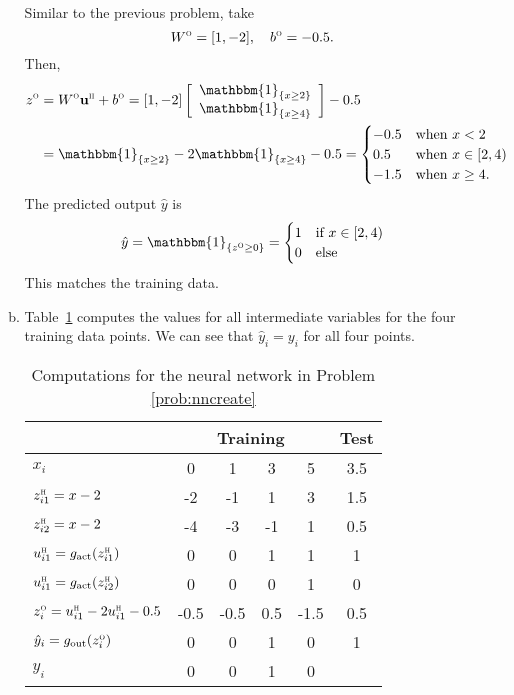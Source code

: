 \documentclass[11pt]{article}
\newcommand{\ubf}{\mathbf{u}}
\newcommand{\indic}[1]{\mathbbm{1}_{ \{ {#1} \} }}
\def\hid{\textsc{\tiny H}}
\def\out{\textsc{\tiny O}}
\begin{document}
\begin{enumerate}
\begin{enumerate}[(a)]
Similar to the previous problem, take
\[
    W^\out = [1, -2], \quad b^\out = -0.5.
\]
Then,
\begin{align*}
    z^\out &= W^\out \ubf^\hid + b^\out =
    [1, -2]\left[ \begin{array}{c} \indic{x \geq 2} \\ \indic{x \geq 4} \end{array} \right]
    - 0.5 \\
    &= \indic{x \geq 2} -2\indic{x \geq 4} - 0.5
    = \begin{cases}
        -0.5 & \mbox{when } x < 2 \\
        0.5 & \mbox{when } x \in [2,4) \\
        -1.5 & \mbox{when } x \geq 4.
     \end{cases}
\end{align*}
The predicted output $\hat{y}$ is
\[
    \hat{y} = \indic{z^\out \geq 0} =
    \begin{cases}
        1 & \mbox{if } x \in [2,4) \\
        0 & \mbox{else}
     \end{cases}
\]
This matches the training data.

\item Table~\ref{tbl:nncreate} computes the values for all intermediate variables
for the four training
data points.  We can see that $\hat{y}_i=y_i$ for all four points.

\begin{table}
\begin{center}
\begin{tabular}{|l|c|c|c|c|c|} \hline
 & \multicolumn{4}{|c|}{Training} & Test \\ \hline
$x_i$ & 0 & 1 & 3 & 5 & 3.5 \\ \hline
$z^\hid_{i1}=x-2$ & -2 & -1 & 1 & 3 & 1.5\\ \hline
$z^\hid_{i2}=x-2$ & -4 & -3 & -1 & 1 & 0.5 \\ \hline
$u^\hid_{i1}=g_{\rm act}(z^\hid_{i1})$ & 0 & 0 & 1 & 1 & 1 \\ \hline
$u^\hid_{i1}=g_{\rm act}(z^\hid_{i2})$ & 0 & 0 & 0 & 1 & 0 \\ \hline
$z^\out_{i}=u^\hid_{i1}-2u^\hid_{i1}-0.5$ & -0.5 & -0.5 & 0.5 & -1.5 & 0.5\\ \hline
$\hat{y}_i = g_{\rm out}(z^\out_i)$ & 0 & 0 & 1 & 0 & 1\\ \hline
$y_i$ & 0 & 0 & 1 & 0 & \\ \hline
\end{tabular}
\end{center}
\caption{Computations for the neural network in Problem \ref{prob:nncreate}}
\label{tbl:nncreate}
\end{table}


\end{enumerate}
\end{enumerate}
\end{document}
